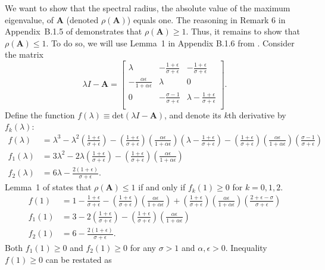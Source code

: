 \documentclass[11pt]{article}
\theoremstyle{definition}
\begin{document}
We want to show that the spectral radius,
the absolute value of the maximum eigenvalue,
of $\mathbf{A}$ (denoted $\rho(\mathbf{A})$) equals one.
The reasoning in Remark 6 in Appendix~B.1.5 of  demonstrates that $\rho(\mathbf{A}) \geq 1$.
Thus, it remains to show that $\rho(\mathbf{A}) \leq 1$.
To do so, we will use Lemma~1 in Appendix B.1.6 from .
Consider the matrix
\begin{equation*}
    \lambda I - \mathbf{A} = \begin{bmatrix}
        \lambda & -\frac{1+\epsilon}{\sigma+\epsilon} & -\frac{1+\epsilon}{\sigma+\epsilon} \\
        -\frac{\alpha \epsilon}{1+\alpha \epsilon} & \lambda & 0 \\
        0 & -\frac{\sigma-1}{\sigma + \epsilon} & \lambda - \frac{1+\epsilon}{\sigma + \epsilon} \\
    \end{bmatrix}.
\end{equation*}
Define the function $f(\lambda) \equiv \text{det}(\lambda I - \mathbf{A})$,
and denote its $k$th derivative by $f_k(\lambda)$:
\begin{align*}
f(\lambda) &= \lambda^3 - \lambda^2 \left(\frac{1+\epsilon}{\sigma + \epsilon}\right) 
- \left(\frac{1+\epsilon}{\sigma + \epsilon}\right) \left(\frac{\alpha \epsilon}{1+\alpha \epsilon}\right) \left(\lambda - \frac{1+\epsilon}{\sigma+\epsilon}\right)
- \left(\frac{1+\epsilon}{\sigma + \epsilon}\right) \left(\frac{\alpha \epsilon}{1+\alpha \epsilon}\right) \left(\frac{\sigma-1}{\sigma+\epsilon}\right) \\
f_1(\lambda) &= 3 \lambda^2 - 2 \lambda \left(\frac{1+\epsilon}{\sigma + \epsilon}\right) - \left(\frac{1+\epsilon}{\sigma + \epsilon}\right)\left(\frac{\alpha \epsilon}{1+\alpha \epsilon}\right)\\
f_2(\lambda) &= 6 \lambda - \frac{2 (1+\epsilon)}{\sigma + \epsilon}.
\end{align*}
Lemma~1 of  states that $\rho(\mathbf{A}) \leq 1$ if and only if $f_k(1) \geq 0$ for $k=0,1,2$.
\begin{align*}
    f(1) &= 1 - \frac{1+\epsilon}{\sigma+\epsilon}
    - \left(\frac{1+\epsilon}{\sigma + \epsilon}\right) \left(\frac{\alpha \epsilon}{1+\alpha \epsilon}\right)
    + \left(\frac{1+\epsilon}{\sigma + \epsilon}\right) \left(\frac{\alpha \epsilon}{1+\alpha \epsilon}\right) \left(\frac{2 + \epsilon - \sigma}{\sigma+\epsilon}\right) \\
    f_1(1) &= 3 - 2 \left(\frac{1+\epsilon}{\sigma + \epsilon}\right) - \left(\frac{1+\epsilon}{\sigma + \epsilon}\right)\left(\frac{\alpha \epsilon}{1+\alpha \epsilon}\right) \\
    f_2(1) &= 6 - \frac{2 (1+\epsilon)}{\sigma + \epsilon}.
\end{align*}
Both $f_1(1) \geq 0$ and $f_2(1) \geq 0$ for any $\sigma>1$ and $\alpha, \epsilon > 0$.
Inequality $f(1) \geq 0$  can be restated as
   
\end{document}
